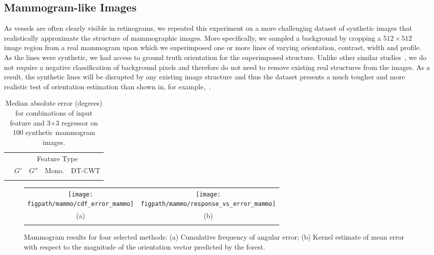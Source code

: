 \documentclass[runningheads,a4paper]{llncs}
\def\dtcwt{DT-$\mathbb{C}$WT}
\def\figpath{./figs}
\begin{document}
\subsection{Mammogram-like Images}
\label{s:expts_synth_mammography}
As vessels are often clearly visible in retinograms, we repeated this experiment on a more challenging dataset of synthetic images that realistically approximate the structure of mammographic images. More specifically, we sampled a background by cropping a $512{\times}512$ image region from a real mammogram upon which we superimposed one or more lines of varying orientation, contrast, width and profile. As the lines were synthetic, we had access to ground truth orientation for the superimposed structure. Unlike other similar studies~\cite{Berks_etal_IPMI11}, we do not require a negative classification of background pixels and therefore do not need to remove existing real structures from the images. As a result, the synthetic lines will be disrupted by any existing image structure and thus the dataset presents a much tougher and more realistic test of orientation estimation than shown in, for example,~\cite{Berks_etal_IPMI11}.

\begin{table}[t]
\centering
\begin{tabular}{l c c c c}
\toprule
							& \multicolumn{4}{c}{Feature Type} \\
							& $G'$		& $G''$	& Mono.				& \dtcwt \\
\cmidrule{2-5}

\bottomrule
\noalign{\smallskip}
\end{tabular}
%
\caption{Median absolute error (degrees) for combinations of input feature and {3{$\times$}3} regressor on 100 synthetic mammogram images.}
\label{t:synth_mammography}
\end{table}

\begin{figure}[t]
\centering
\begin{tabular}{c c}
\texttt{[image: \\figpath/mammo/cdf\_error\_mammo]} &
\texttt{[image: \\figpath/mammo/response\_vs\_error\_mammo]} \\
(a) & (b) \\
\noalign{\smallskip}
\end{tabular}
%
\caption{Mammogram results for four selected methods: (a) Cumulative frequency of angular error; (b) Kernel estimate of mean error with respect to the magnitude of the orientation vector predicted by the forest.}
\label{f:mammo_graphs}
\end{figure}
\end{document}
